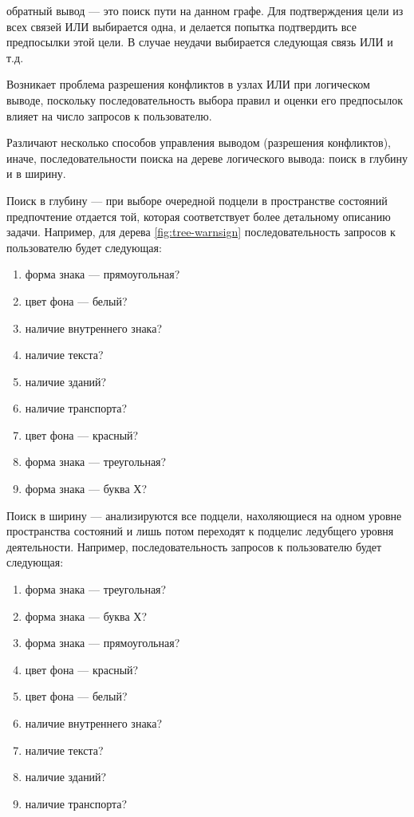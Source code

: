 обратный вывод --- это поиск пути на данном графе. Для подтверждения цели из всех связей ИЛИ выбирается одна, и делается попытка подтвердить все предпосылки этой цели. В случае неудачи выбирается следующая связь ИЛИ и т.д.

Возникает проблема разрешения конфликтов в узлах ИЛИ при логическом выводе, поскольку последовательность выбора правил и оценки его предпосылок влияет на число запросов к пользователю.

Различают несколько способов управления выводом (разрешения конфликтов), иначе, последовательности поиска на дереве логического вывода: поиск в глубину и в ширину.

Поиск в глубину --- при выборе очередной подцели в пространстве состояний предпочтение отдается той, которая соответствует более детальному описанию  задачи. Например, для дерева \ref{fig:tree-warnsign} последовательность запросов к пользователю будет следующая:
\begin{enumerate}
    \item форма знака --- прямоугольная?
    \item цвет фона --- белый?
    \item наличие внутреннего знака?
    \item наличие текста?
    \item наличие зданий?
    \item наличие транспорта?
    \item цвет фона --- красный?
    \item форма знака --- треугольная?
    \item форма знака --- буква Х?
\end{enumerate}

Поиск в ширину --- анализируются все подцели, нахоляющиеся на одном уровне пространства состояний и лишь потом переходят к подцелис ледубщего уровня деятельности. Например, последовательность запросов к пользователю будет следующая:
\begin{enumerate}
    \item форма знака --- треугольная?
    \item форма знака --- буква Х?
    \item форма знака --- прямоугольная?
    \item цвет фона --- красный?
    \item цвет фона --- белый?
    \item наличие внутреннего знака?
    \item наличие текста?
    \item наличие зданий?
    \item наличие транспорта?
\end{enumerate}

